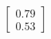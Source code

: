 \documentclass[preview]{standalone}
\begin{document}
\begin{align*}
\begin{bmatrix} 0.79 \\ 0.53 \end{bmatrix}
\end{align*}
\end{document}
